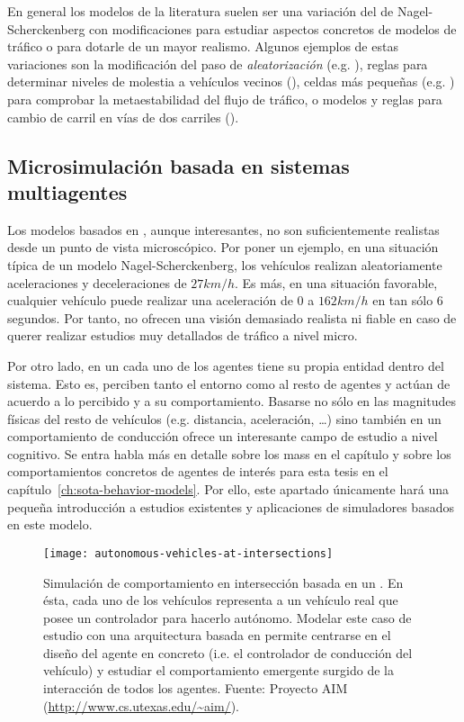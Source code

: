 En general los modelos de la literatura suelen ser una variación del de Nagel-Scherckenberg con modificaciones para estudiar aspectos concretos de modelos de tráfico o para dotarle de un mayor realismo. Algunos ejemplos de estas variaciones son la modificación del paso de \textit{aleatorización} (e.g. \cite{Barlovic1998}), reglas para determinar niveles de molestia a vehículos vecinos (\cite{Wagner1997}), celdas más pequeñas (e.g. \cite{Krauss1997}) para comprobar la metaestabilidad del flujo de tráfico, o modelos y reglas para cambio de carril en vías de dos carriles (\cite{Brilon1999, Nagel1998}).

\subsection{Microsimulación basada en sistemas multiagentes}

Los modelos basados en , aunque interesantes, no son suficientemente realistas desde un punto de vista microscópico. Por poner un ejemplo, en una situación típica de un modelo Nagel-Scherckenberg, los vehículos realizan aleatoriamente aceleraciones y deceleraciones de $27 km/h$. Es más, en una situación favorable, cualquier vehículo puede realizar una aceleración de $0$ a $162km/h$ en tan sólo $6$ segundos. Por tanto, no ofrecen una visión demasiado realista ni fiable en caso de querer realizar estudios muy detallados de tráfico a nivel micro.

Por otro lado, en un  cada uno de los agentes tiene su propia entidad dentro del sistema. Esto es, perciben tanto el entorno como al resto de agentes y actúan de acuerdo a lo percibido y a su comportamiento. Basarse no sólo en las magnitudes físicas del resto de vehículos (e.g. distancia, aceleración, \ldots) sino también en un comportamiento de conducción ofrece un interesante campo de estudio a nivel cognitivo. Se entra habla más en detalle sobre los \glspl{mas} en el capítulo  y sobre los comportamientos concretos de agentes de interés para esta tesis en el capítulo~\ref{ch:sota-behavior-models}. Por ello, este apartado únicamente hará una pequeña introducción a estudios existentes y aplicaciones de simuladores basados en este modelo.

\begin{figure}[t]
	\centering
	\texttt{[image: autonomous-vehicles-at-intersections]}
	\caption[Simulación de comportamiento en intersección basada en un ]{Simulación de comportamiento en intersección basada en un . En ésta, cada uno de los vehículos representa a un vehículo real que posee un controlador para hacerlo autónomo. Modelar este caso de estudio con una arquitectura basada en  permite centrarse en el diseño del agente en concreto (i.e. el controlador de conducción del vehículo) y estudiar el comportamiento emergente surgido de la interacción de todos los agentes. Fuente: Proyecto AIM (\url{http://www.cs.utexas.edu/~aim/}).}
	\label{fig:autonomous-vehicles-at-intersections}
\end{figure}

